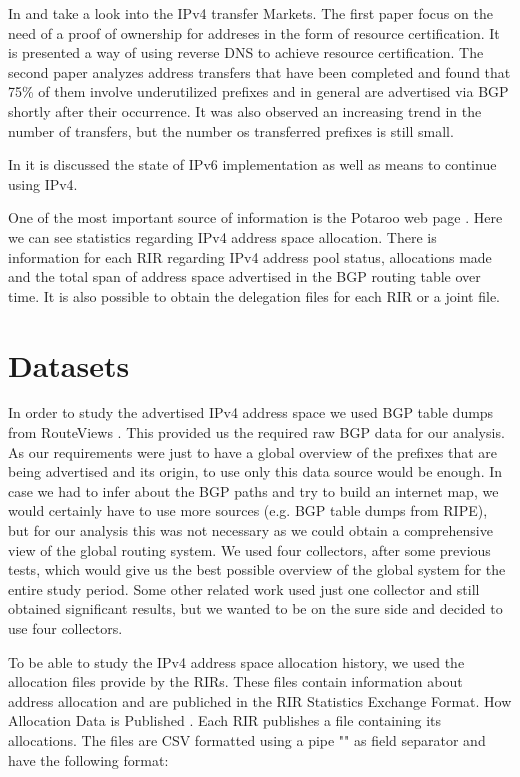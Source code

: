 \documentclass[11pt,a4paper]{scrreprt}
\begin{document}
In \cite{Land_Grab} and  \cite{IPv4_Transfer_Markets} take a look into the IPv4 transfer Markets. The first paper focus on the need of a proof of ownership for addreses in the form of resource certification. It is presented a way of using reverse DNS to achieve resource certification. The second paper analyzes address transfers that have been completed and found that 75\% of them involve underutilized prefixes and in general are advertised via BGP shortly after their occurrence. It was also observed an increasing trend in the number of transfers, but the number os transferred prefixes is still small.

In \cite{IPv6_state} it is discussed the state of IPv6 implementation as well as means to continue using IPv4.

One of the most important source of information is the Potaroo web page \cite{Potaroo}. 
Here we can see statistics regarding IPv4 address space allocation. There is information for each RIR regarding IPv4 address pool status, allocations made and the total span of address space advertised in the BGP routing table over time. It is also possible to obtain the delegation files for each RIR or a joint file.


\chapter{Datasets}

In order to study the advertised IPv4 address space we used BGP table dumps from RouteViews \cite{RouteViews}. This provided us the required raw BGP data for our analysis. As our requirements were just to have a global overview of the prefixes that are being advertised and its origin, to use only this data source would be enough. In case we had to infer about the BGP paths and try to build an internet map, we would certainly have to use more sources (e.g. BGP table dumps from RIPE), but for our analysis this was not necessary as we could obtain a comprehensive view of the global routing system.
We used four collectors, after some previous tests, which would give us the best possible overview of the global system for the entire study period. Some other related work \cite{Address_Space_Deaggregation} used just one collector and still obtained significant results, but we wanted to be on the sure side and decided to use four collectors. 

To be able to study the IPv4 address space allocation history, we used the allocation files \cite{Potaroo} provide by the RIRs. These files contain information about address allocation and are publiched in the RIR Statistics Exchange Format.
How Allocation Data is Published \cite{ALLOC_FILES}. Each RIR publishes a file containing its allocations. The files are CSV formatted using a pipe "\textbar" as field separator and have the following format:
\vspace{5mm}
\end{document}
